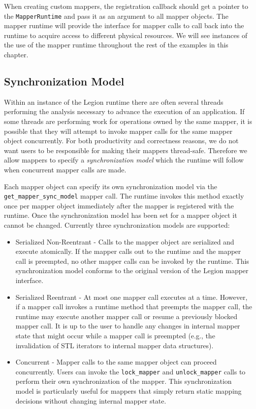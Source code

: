 When creating custom mappers, the registration callback should get a pointer
to the {\tt MapperRuntime} and pass it as an argument to all mapper objects.
The mapper runtime will provide the interface for mapper calls to call back
into the runtime to acquire access to different physical resources. We 
will see instances of the use of the mapper runtime throughout the rest of
the examples in this chapter.

\subsection{Synchronization Model}
\label{subsec:mapping:sync}

Within an instance of the Legion runtime there are often several threads
performing the analysis necessary to advance the execution of an
application. If some threads are performing work for operations 
owned by the same mapper, it is possible that they will attempt to 
invoke mapper calls for the same mapper object concurrently. For both 
productivity and correctness reasons, we do not want users to be
responsible for making their mappers thread-safe. Therefore we allow
mappers to specify a {\em synchronization model} which the runtime will
follow when concurrent mapper calls are made.

Each mapper object can specify its own synchronization model via the
{\tt get\_mapper\_sync\_model} mapper call. The runtime invokes this
method exactly once per mapper object immediately after the mapper is
registered with the runtime. Once the synchronization model has been set
for a mapper object it cannot be changed. Currently three
synchronization models are supported:

\begin{itemize}
\item Serialized Non-Reentrant - Calls to the
      mapper object are serialized and execute atomically. If the mapper 
      calls out to the runtime and the mapper call is preempted, 
      no other mapper calls can be invoked by the runtime.
      This synchronization model conforms to the original version of
      the Legion mapper interface.
\item Serialized Reentrant - At most one mapper call
      executes at a time. However, if a mapper call invokes a runtime
      method that preempts the mapper call, the runtime may
      execute another mapper call or resume a previously blocked
      mapper call. It is up to the user to handle any changes in internal mapper
      state that might occur while a mapper call is preempted (e.g., the
      invalidation of STL iterators to internal mapper data structures).
\item Concurrent - Mapper calls to the same mapper object can
      proceed concurrently. Users can invoke the {\tt lock\_mapper} and
      {\tt unlock\_mapper} calls to perform their own synchronization
      of the mapper. This synchronization model is particularly useful for
      mappers that simply return static mapping decisions
      without changing internal mapper state.
\end{itemize}

